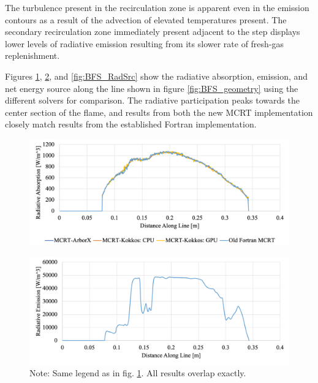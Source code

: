 The turbulence present in the recirculation zone is apparent even in the emission contours as a result of the advection of elevated temperatures present. The secondary recirculation zone immediately present adjacent to the step displays lower levels of radiative emission resulting from its slower rate of fresh-gas replenishment.

Figures \ref{fig:BFS_RadAbs}, \ref{fig:BFS_RadEmi}, and \ref{fig:BFS_RadSrc} show the radiative absorption, emission, and net energy source along the line shown in figure \ref{fig:BFS_geometry} using the different solvers for comparison. 
The radiative participation peaks towards the center section of the flame, and results from both the new MCRT implementation closely match results from the established Fortran implementation.

\begin{figure}[!ht]
\includegraphics[width=\linewidth]{figures/ch4/LineComparison_RadAbs.png}
\caption{}
\label{fig:BFS_RadAbs}
\end{figure}

\begin{figure}[!ht]
\includegraphics[width=\linewidth]{figures/ch4/LineComparison_RadEmi.png}
\caption{Note: Same legend as in fig. \ref{fig:BFS_RadAbs}. All results overlap exactly.}
\label{fig:BFS_RadEmi}
\end{figure}

